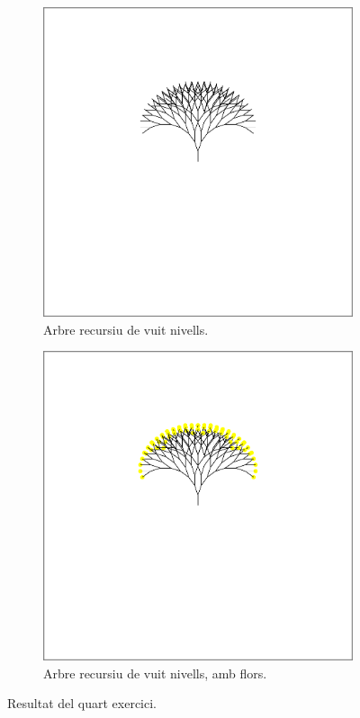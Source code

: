 \documentclass[catalan, a4paper]{scrartcl}
\begin{document}
\begin{figure}
  \centering
  \begin{subfigure}{0.7\columnwidth}
  \centering
  \includegraphics[width=.95\columnwidth]{../p2/ex4a.pdf}
  \caption{\label{fig:ex4a} Arbre recursiu de vuit nivells.}
  \end{subfigure}
  \begin{subfigure}{0.7\columnwidth}
  \centering
  \includegraphics[width=.95\columnwidth]{../p2/ex4.pdf}
  \caption{\label{fig:ex4b} Arbre recursiu de vuit nivells, amb flors.}
  \end{subfigure}
  \caption{\label{fig:ex4} Resultat del quart exercici.}
\end{figure}
\end{document}
